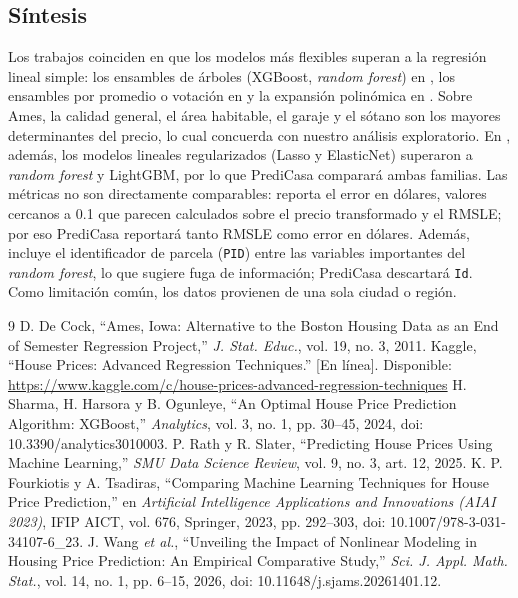 \documentclass[journal]{IEEEtran}
\begin{document}
\subsection{Síntesis}
Los trabajos coinciden en que los modelos más flexibles superan a la regresión lineal simple: los ensambles de árboles (XGBoost, \textit{random forest}) en \cite{sharma2024,rath2025}, los ensambles por promedio o votación en \cite{fourkiotis2023} y la expansión polinómica en \cite{wang2026}. Sobre Ames, la calidad general, el área habitable, el garaje y el sótano son los mayores determinantes del precio, lo cual concuerda con nuestro análisis exploratorio. En \cite{fourkiotis2023}, además, los modelos lineales regularizados (Lasso y ElasticNet) superaron a \textit{random forest} y LightGBM, por lo que PrediCasa comparará ambas familias. Las métricas no son directamente comparables: \cite{rath2025} reporta el error en dólares, \cite{sharma2024} valores cercanos a 0.1 que parecen calculados sobre el precio transformado y \cite{fourkiotis2023} el RMSLE; por eso PrediCasa reportará tanto RMSLE como error en dólares. Además, \cite{rath2025} incluye el identificador de parcela (\texttt{PID}) entre las variables importantes del \textit{random forest}, lo que sugiere fuga de información; PrediCasa descartará \texttt{Id}. Como limitación común, los datos provienen de una sola ciudad o región.

\begin{thebibliography}{9}
 D. De Cock, ``Ames, Iowa: Alternative to the Boston Housing Data as an End of Semester Regression Project,'' \textit{J. Stat. Educ.}, vol. 19, no. 3, 2011.
 Kaggle, ``House Prices: Advanced Regression Techniques.'' [En línea]. Disponible: \url{https://www.kaggle.com/c/house-prices-advanced-regression-techniques}
 H. Sharma, H. Harsora y B. Ogunleye, ``An Optimal House Price Prediction Algorithm: XGBoost,'' \textit{Analytics}, vol. 3, no. 1, pp. 30--45, 2024, doi: 10.3390/analytics3010003.
 P. Rath y R. Slater, ``Predicting House Prices Using Machine Learning,'' \textit{SMU Data Science Review}, vol. 9, no. 3, art. 12, 2025.
 K. P. Fourkiotis y A. Tsadiras, ``Comparing Machine Learning Techniques for House Price Prediction,'' en \textit{Artificial Intelligence Applications and Innovations (AIAI 2023)}, IFIP AICT, vol. 676, Springer, 2023, pp. 292--303, doi: 10.1007/978-3-031-34107-6\_23.
 J. Wang \textit{et al.}, ``Unveiling the Impact of Nonlinear Modeling in Housing Price Prediction: An Empirical Comparative Study,'' \textit{Sci. J. Appl. Math. Stat.}, vol. 14, no. 1, pp. 6--15, 2026, doi: 10.11648/j.sjams.20261401.12.
\end{thebibliography}
\end{document}
